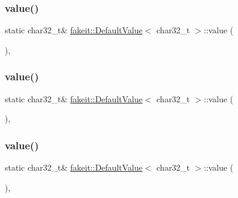 \subsubsection{\texorpdfstring{value()}{value()}\hspace{0.1cm}{\footnotesize\ttfamily [1/9]}}
{\footnotesize\ttfamily static char32\+\_\+t\& \mbox{\hyperlink{structfakeit_1_1DefaultValue}{fakeit\+::\+Default\+Value}}$<$ char32\+\_\+t $>$\+::value (\begin{DoxyParamCaption}{ }\end{DoxyParamCaption})\hspace{0.3cm}{\ttfamily [inline]}, {\ttfamily [static]}}

\mbox{\label{structfakeit_1_1DefaultValue_3_01char32__t_01_4_ac13a220a319b9ad49e7e5e639b743f85}} 
\subsubsection{\texorpdfstring{value()}{value()}\hspace{0.1cm}{\footnotesize\ttfamily [2/9]}}
{\footnotesize\ttfamily static char32\+\_\+t\& \mbox{\hyperlink{structfakeit_1_1DefaultValue}{fakeit\+::\+Default\+Value}}$<$ char32\+\_\+t $>$\+::value (\begin{DoxyParamCaption}{ }\end{DoxyParamCaption})\hspace{0.3cm}{\ttfamily [inline]}, {\ttfamily [static]}}

\mbox{\label{structfakeit_1_1DefaultValue_3_01char32__t_01_4_ac13a220a319b9ad49e7e5e639b743f85}} 
\subsubsection{\texorpdfstring{value()}{value()}\hspace{0.1cm}{\footnotesize\ttfamily [3/9]}}
{\footnotesize\ttfamily static char32\+\_\+t\& \mbox{\hyperlink{structfakeit_1_1DefaultValue}{fakeit\+::\+Default\+Value}}$<$ char32\+\_\+t $>$\+::value (\begin{DoxyParamCaption}{ }\end{DoxyParamCaption})\hspace{0.3cm}{\ttfamily [inline]}, {\ttfamily [static]}}

